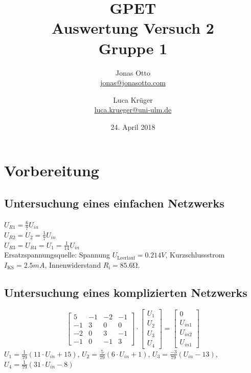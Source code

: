 \documentclass[a4paper]{article}
\title{GPET\\ Auswertung Versuch 2\\ Gruppe 1}
\author{Jonas Otto\\ \href{mailto:jonas@jonasotto.com}{jonas@jonasotto.com} 
   \and Luca Krüger \\ \href{mailto:luca.krueger@uni-ulm.de}{luca.krueger@uni-ulm.de} }
\date{24. April 2018}
\begin{document}
\maketitle

\section{Vorbereitung}

\subsection{Untersuchung eines einfachen Netzwerks}

$U_{R1}=\frac{6}{7}U_{in}$\\
$U_{R2}=U_2=\frac{1}{7}U_{in}$\\
$U_{R3}=U_{R4}=U_1=\frac{1}{14}U_{in}$\\

\noindent
Ersatzspannungsquelle: Spannung $U_{\text{Leerlauf}}=0.214\si{V}$, Kurzschlussstrom  $I_{\text{KS}}=2.5\si{mA}$, Innenwiderstand  $R_{\text{i}}=85.6\si{\ohm}$.

\subsection{Untersuchung eines komplizierten Netzwerks}

\[
\begin{bmatrix}
    5 & -1 & -2 & -1\\
    -1 & 3 & 0 & 0\\
    -2 & 0 & 3 & -1\\
    -1 & 0 & -1 & 3
\end{bmatrix}
\cdot
\begin{bmatrix}
    U_1\\
    U_2\\
    U_3\\
    U_4
\end{bmatrix}
=
\begin{bmatrix}
    0\\
    U_{in1}\\
    U_{in2}\\
    U_{in1}
\end{bmatrix}
\]
$U_1 = \frac{1}{79} (11 \cdot U_{in} + 15)$, 
$U_2 = \frac{5}{79} (6 \cdot U_{in} + 1)$, 
$U_3 = \frac{-3}{79} (U_{in} - 13)$, 
$U_4 = \frac{1}{79} (31 \cdot U_{in} - 8)$

\end{document}
